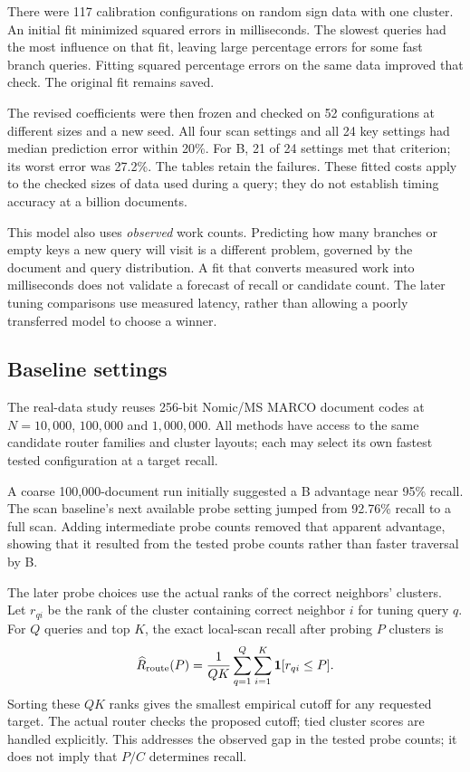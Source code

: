 There were 117 calibration configurations on random sign data with one cluster. An initial
fit minimized squared errors in milliseconds. The slowest queries had the most influence on that fit, leaving large percentage errors
for some fast branch queries. Fitting squared percentage errors on the same data improved
that check. The original fit remains saved.

The revised coefficients were then frozen and checked on 52 configurations at different sizes
and a new seed. All four scan settings and all 24 key settings had median prediction error
within 20\%. For B, 21 of 24 settings met that criterion; its worst error was 27.2\%.
The tables retain the failures. These fitted costs apply to the checked sizes of data used during a query; they do not
establish timing accuracy at a billion documents.

This model also uses \emph{observed} work counts. Predicting how many branches or empty keys a
new query will visit is a different problem, governed by the document and query distribution.
A fit that converts measured work into milliseconds does not validate a forecast of recall or
candidate count. The later tuning comparisons use measured latency, rather than allowing a
poorly transferred model to choose a winner.

\subsection{Baseline settings}
The real-data study reuses 256-bit Nomic/MS MARCO document codes at $N=10{,}000$, $100{,}000$
and $1{,}000{,}000$. All methods have access to the same candidate router families and cluster layouts;
each may select its own fastest tested configuration at a target recall.

A coarse 100,000-document run initially suggested a B advantage near 95\% recall. The scan
baseline's next available probe setting jumped from 92.76\% recall to a full scan. Adding
intermediate probe counts removed that apparent advantage, showing that it resulted from the
tested probe counts rather than faster traversal by B.

The later probe choices use the actual ranks of the correct neighbors' clusters. Let
$r_{qi}$ be the rank of the cluster containing correct neighbor $i$ for tuning query $q$.
For $Q$ queries and top $K$, the exact local-scan recall after probing $P$ clusters is
\begin{equation}
\widehat{R}_{\rm route}(P)=\frac{1}{QK}
       \sum_{q=1}^{Q}\sum_{i=1}^{K}\mathbf 1[r_{qi}\le P].
\label{eq:empirical-route-rank}
\end{equation}
Sorting these $QK$ ranks gives the smallest empirical cutoff for any requested target.
The actual router checks the proposed cutoff; tied cluster scores are handled explicitly.
This addresses the observed gap in the tested probe counts; it does not imply that $P/C$ determines recall.

